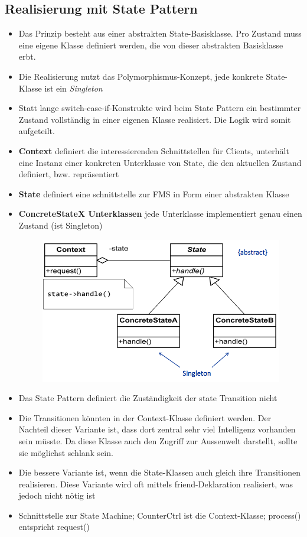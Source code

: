 \subsection{Realisierung mit State Pattern}
\begin{itemize}
  \item Das Prinzip besteht aus einer abstrakten State-Basisklasse. Pro Zustand
  muss eine eigene Klasse definiert werden, die von dieser abstrakten
  Basisklasse erbt.
  \item Die Realisierung nutzt das Polymorphismus-Konzept, jede konkrete
  State-Klasse ist ein \textit{Singleton}
  \item Statt lange switch-case-if-Konstrukte wird beim State Pattern ein
  bestimmter Zustand vollständig in einer eigenen Klasse realisiert. Die Logik
  wird somit aufgeteilt.
  \item \textbf{Context} definiert die interessierenden Schnittstellen für
  Clients, unterhält eine Instanz einer konkreten Unterklasse von State, die den
  aktuellen Zustand definiert, bzw. repräsentiert
  \item \textbf{State} definiert eine schnittstelle zur FMS in Form einer
  abstrakten Klasse
  \item \textbf{ConcreteStateX Unterklassen} jede Unterklasse implementiert
  genau einen Zustand (ist Singleton)
 \begin{figure}[h]
  \centering
  \includegraphics[scale = 0.3]{images/FSM/state_pattern}
\end{figure}
\item Das State Pattern definiert die Zuständigkeit der state Transition nicht
\item Die Transitionen könnten in der Context-Klasse definiert werden. Der
Nachteil dieser Variante ist, dass dort zentral sehr viel Intelligenz vorhanden
sein müsste. Da diese Klasse auch den Zugriff zur Aussenwelt darstellt, sollte
sie möglichst schlank sein.
\item Die bessere Variante ist, wenn die State-Klassen auch gleich ihre
Transitionen realisieren. Diese Variante wird oft mittels friend-Deklaration
realisiert, was jedoch nicht nötig ist
\item Schnittstelle zur State Machine; CounterCtrl ist die Context-Klasse; process() entspricht request()
\end{itemize}

